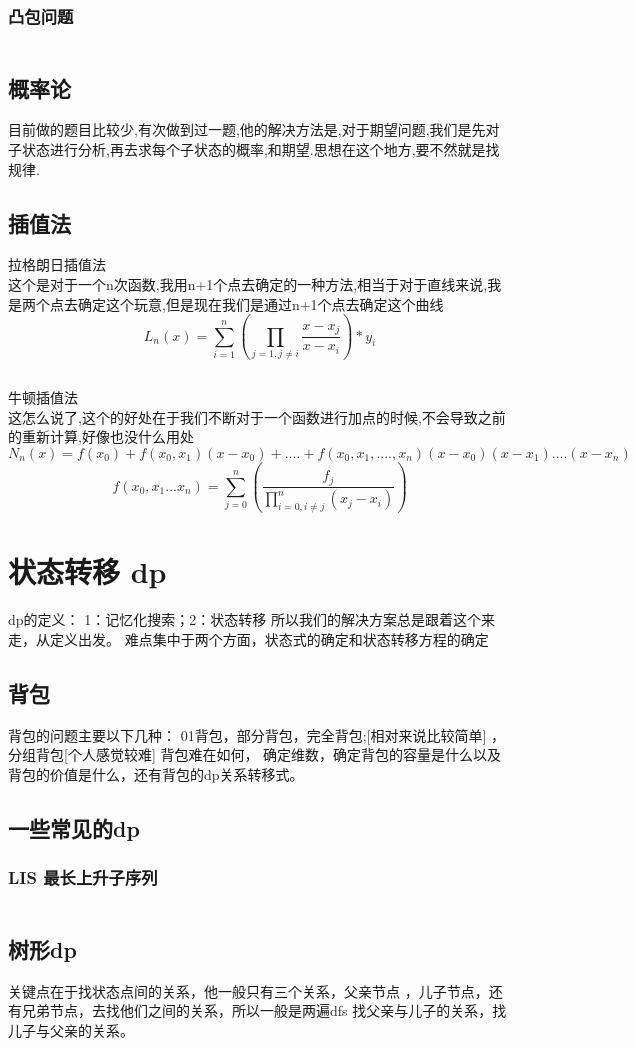 \documentclass[a4paper,13.6pt]{article}
\begin{document}
\begin{CJK}{UTF8}{gbsn}
\subsubsection{凸包问题}
\inputminted{c++}{../scoure/math/tubao.cpp}
\subsection{概率论}
目前做的题目比较少,有次做到过一题,他的解决方法是,对于期望问题,我们是先对子状态进行分析,再去求每个子状态的概率,和期望.思想在这个地方,要不然就是找规律.
\subsection{插值法}
拉格朗日插值法\\
这个是对于一个n次函数,我用n+1个点去确定的一种方法,相当于对于直线来说,我是两个点去确定这个玩意,但是现在我们是通过n+1个点去确定这个曲线
$$ L_n(x) = \sum_{i = 1}^n(\prod_{j=1,j \neq i}\frac{x-x_j}{x-x_i})*y_i$$
\inputminted{c++}{../scoure/math/lang.cpp}
牛顿插值法\\
这怎么说了,这个的好处在于我们不断对于一个函数进行加点的时候,不会导致之前的重新计算,好像也没什么用处
$$N_n(x) = f(x_0) + f(x_0,x_1)(x-x_0)+  .... +f(x_0,x_1,....,x_n)(x-x_0)(x-x_1)....(x - x_n)$$
$$ f(x_0,x_1...x_n) = \sum_{j = 0}^n(\frac{f_j}{\prod_{i =0,i \neq j}^n(x_j-x_i)} )$$
\section{状态转移 dp}
dp的定义：
1：记忆化搜索；2：状态转移
所以我们的解决方案总是跟着这个来走，从定义出发。
难点集中于两个方面，状态式的确定和状态转移方程的确定
\subsection{背包}
背包的问题主要以下几种：
01背包，部分背包，完全背包;[相对来说比较简单] ，分组背包[个人感觉较难]
背包难在如何， 确定维数，确定背包的容量是什么以及背包的价值是什么，还有背包的dp关系转移式。
\subsection{一些常见的dp}
\subsubsection{LIS 最长上升子序列}
\inputminted{c++}{../scoure/dp/longerxuelie.cpp}
\subsection{树形dp}
关键点在于找状态点间的关系，他一般只有三个关系，父亲节点
，儿子节点，还有兄弟节点，去找他们之间的关系，所以一般是两遍dfs
找父亲与儿子的关系，找儿子与父亲的关系。

\end{CJK}
\end{document}
